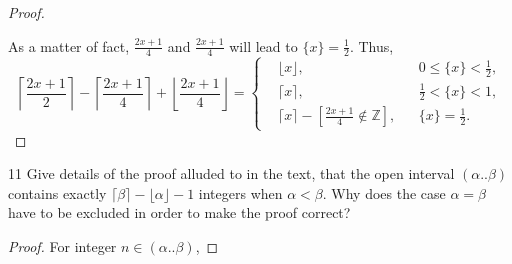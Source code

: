 \documentclass[a4paper,12pt]{article}
\theoremstyle{definition}
\newenvironment{problems}{\begin{list}{}{\renewcommand{\makelabel}[1]{\textbf{##1}\hfil}}}{\end{list}}
\begin{document}
\begin{problems}
\begin{proof}
\begin{description}
        \end{description}

        As a matter of fact, $\frac{2x+1}{4}$ and $\frac{2x+1}{4}$ will lead to $\{x\}=\frac{1}{2}$. Thus,
        \begin{equation*}
            \left\lceil\frac{2x+1}{2}\right\rceil - \left\lceil\frac{2x+1}{4}\right\rceil + \left\lfloor\frac{2x+1}{4}\right\rfloor = \left\{\begin{aligned}
                &\lfloor x\rfloor, && 0\leq \{x\}<\frac{1}{2},\\
                &\lceil x\rceil, && \frac{1}{2}<\{x\}<1,\\
                &\lceil x \rceil - \left[\frac{2x+1}{4}\not\in\mathbb{Z}\right], && \{x\} = \frac{1}{2}.
            \end{aligned}\right.
        \end{equation*}
    \end{proof}

    \item[11] Give details of the proof alluded to in the text,  that the open interval $(\alpha .. \beta)$ contains exactly $\lceil \beta\rceil-\lfloor \alpha\rfloor-1$ integers when $\alpha < \beta$.  Why does the case $\alpha=\beta$ have to be excluded in order to make the proof correct?
   
    \begin{proof}
        For integer $n\in(\alpha .. \beta)$,


\end{proof}
\end{problems}
\end{document}

